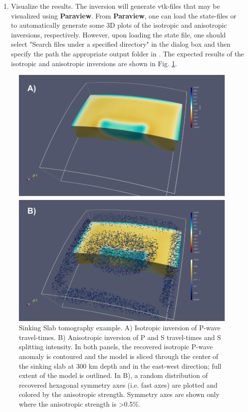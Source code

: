 \begin{enumerate}
    \item Visualize the results. The inversion will generate vtk-files that may be visualized using \textbf{Paraview}. From \textbf{Paraview}, one can load the state-files  or  to automatically generate some 3D plots of the isotropic and anisotropic inversions, respectively. However, upon loading the state file, one should select "Search files under a specified directory" in the dialog box and then specify the path the appropriate output folder in . The expected results of the isotropic and anisotropic inversions are shown in Fig. \ref{fig:psi_d_results}.
\end{enumerate}

\begin{figure}[ht]
    \centering
    \includegraphics{PSI_D/PSI_D_Results.png}
    \caption{Sinking Slab tomography example. A) Isotropic inversion of P-wave travel-times. B) Anisotropic inversion of P and S travel-times and S splitting intensity. In both panels, the recovered isotropic P-wave anomaly is contoured and the model is sliced through the center of the sinking slab at 300 km depth and in the east-west direction; full extent of the model is outlined. In B), a random distribution of recovered hexagonal symmetry axes (i.e. fast axes) are plotted and colored by the anisotropic strength. Symmetry axes are shown only where the anisotropic strength is >0.5\%.\\
    }
    \label{fig:psi_d_results}
\end{figure}

